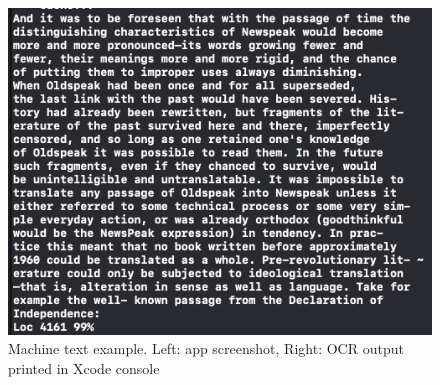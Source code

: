 \documentclass[a4paper,11pt]{article}
\begin{document}
\begin{figure}[H]
    \includegraphics[width={0.5\linewidth}]{img/ios_test_app/testapp_kindle_output.png}
    \caption{Machine text example. Left: app screenshot, Right: OCR output printed in Xcode console}
    \label{machine-text-ios-example}
\end{figure}
\end{document}
